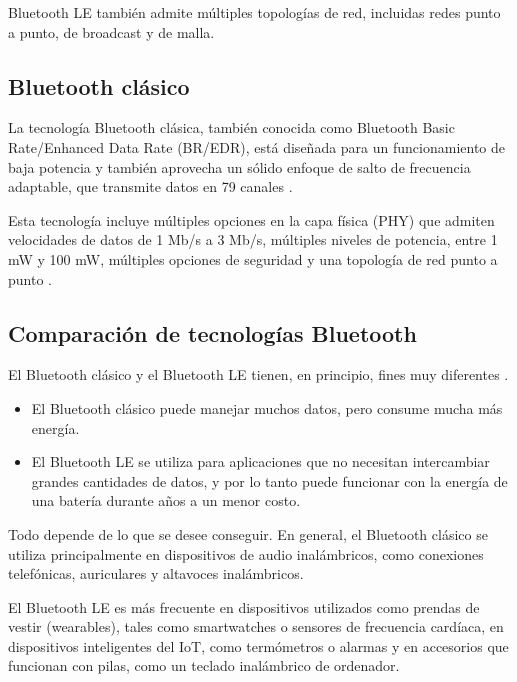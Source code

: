 Bluetooth LE también admite múltiples topologías de red, incluidas redes punto a punto, de broadcast y de malla.


\subsection{Bluetooth clásico}

La tecnología Bluetooth clásica, también conocida como Bluetooth Basic Rate/Enhanced Data Rate (BR/EDR), está diseñada para un funcionamiento de baja potencia y también aprovecha un sólido enfoque de salto de frecuencia adaptable, que transmite datos en 79 canales \cite{bluetooth}.

Esta tecnología incluye múltiples opciones en la capa física (PHY) que admiten velocidades de datos de 1 Mb/s a 3 Mb/s, múltiples niveles de potencia, entre 1 mW y 100 mW, múltiples opciones de seguridad y una topología de red punto a punto \cite{bluetooth}.

\subsection{Comparación de tecnologías Bluetooth}

El Bluetooth clásico y el Bluetooth LE tienen, en principio, fines muy diferentes \cite{bluetoothV}.

\begin{itemize}

\item El Bluetooth clásico puede manejar muchos datos, pero consume mucha más energía.

\item El Bluetooth LE se utiliza para aplicaciones que no necesitan intercambiar grandes cantidades de datos, y por lo tanto puede funcionar con la energía de una batería durante años a un menor costo.

\end{itemize}

Todo depende de lo que se desee conseguir. En general, el Bluetooth clásico se utiliza principalmente en dispositivos de audio inalámbricos, como conexiones telefónicas, auriculares y altavoces inalámbricos.

El Bluetooth LE es más frecuente en dispositivos utilizados como prendas de vestir (wearables), tales como smartwatches o sensores de frecuencia cardíaca, en dispositivos inteligentes del IoT, como termómetros o alarmas y en accesorios que funcionan con pilas, como un teclado inalámbrico de ordenador.

